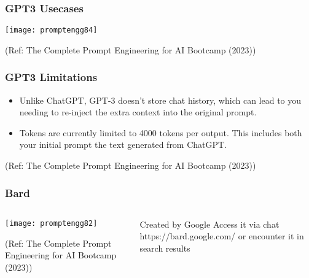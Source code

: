 \begin{frame}[fragile]\frametitle{GPT3 Usecases}


		\begin{center}
		\texttt{[image: promptengg84]}

		{\tiny (Ref: The Complete Prompt Engineering for AI Bootcamp (2023))}
		\end{center}	

\end{frame}

\begin{frame}[fragile]\frametitle{GPT3 Limitations}




\begin{itemize}
\item  Unlike ChatGPT, GPT-3 doesn’t store chat history, which can lead to you needing to re-inject the extra context into the
original prompt.
\item Tokens are currently limited to 4000 tokens per output. This includes both your initial prompt the text generated
from ChatGPT.

\end{itemize}	 

{\tiny (Ref: The Complete Prompt Engineering for AI Bootcamp (2023))}

\end{frame}


\begin{frame}[fragile]\frametitle{Bard}


\begin{columns}
    \begin{column}[T]{0.6\linewidth}
		\begin{center}
		\texttt{[image: promptengg82]}

		{\tiny (Ref: The Complete Prompt Engineering for AI Bootcamp (2023))}
		\end{center}	
    \end{column}
    \begin{column}[T]{0.4\linewidth}
		Created by Google
		Access it via chat https://bard.google.com/ or encounter it in search results
    \end{column}
  \end{columns}
\end{frame}